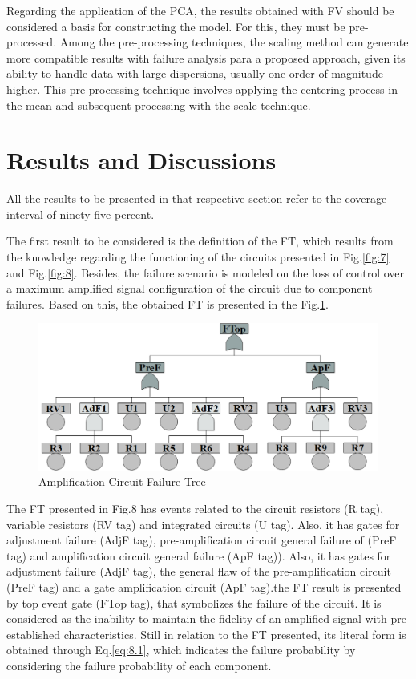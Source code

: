 \documentclass{ws-m3as}
\begin{document}
Regarding the application of the PCA, the results obtained with FV should be considered a basis for constructing the model. For this, they must be pre-processed. Among the pre-processing techniques, the scaling method can generate more compatible results with failure analysis para a proposed approach, given its ability to handle data with large dispersions, usually one order of magnitude higher. This pre-processing technique involves applying the centering process in the mean and subsequent processing with the scale technique.

\section{Results and Discussions}

All the results to be presented in that respective section refer to the coverage interval of ninety-five percent.

The first result to be considered is the definition of the FT, which results from the knowledge regarding the functioning of the circuits presented in Fig.\ref{fig:7} and Fig.\ref{fig:8}. Besides, the failure scenario is modeled on the loss of control over a maximum amplified signal configuration of the circuit due to component failures. Based on this, the obtained FT is presented in the Fig.\ref{fig:9}.

\begin{figure}[H]
	\centering  
	\includegraphics[width=0.95\linewidth]{Figures/FaultTree}
	\caption{Amplification Circuit Failure Tree}
	\label{fig:9}
\end{figure}

The FT presented in Fig.8 has events related to the circuit resistors (R tag), variable resistors (RV tag) and integrated circuits (U tag). Also, it has gates for adjustment failure (AdjF tag), pre-amplification circuit general failure of (PreF tag) and amplification circuit general failure (ApF tag)). Also, it has gates for adjustment failure (AdjF tag), the general flaw of the pre-amplification circuit (PreF tag) and a gate amplification circuit (ApF tag).the FT result is presented by top event gate (FTop tag), that symbolizes the failure of the circuit. It is considered as the inability to maintain the fidelity of an amplified signal with pre-established characteristics. Still in relation to the FT presented, its literal form is obtained through Eq.\ref{eq:8.1}, which indicates the failure probability by considering the failure probability of each component. 
\end{document}
